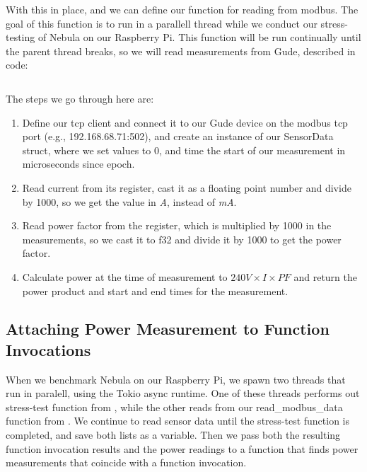 \documentclass[
  table]{report}
\providecommand{\tightlist}{%
  \setlength{\itemsep}{0pt}\setlength{\parskip}{0pt}}
\begin{document}
\inputminted[firstline = 33, lastline = 60]{rust}{assets/code/modbus.rs}

With this in place, and we can define our function for reading from
modbus. The goal of this function is to run in a parallell thread while
we conduct our stress-testing of Nebula on our Raspberry Pi. This
function will be run continually until the parent thread breaks, so we
will read measurements from Gude, described in code:

\inputminted[firstline = 0, lastline = 31]{rust}{assets/code/modbus.rs}

The steps we go through here are:

\begin{enumerate}
\def\labelenumi{\arabic{enumi}.}
\tightlist
\item
  Define our tcp client and connect it to our Gude device on the modbus
  tcp port (e.g., 192.168.68.71:502), and create an instance of our
  SensorData struct, where we set values to 0, and time the start of our
  measurement in microseconds since epoch.
\item
  Read current from its register, cast it as a floating point number and
  divide by 1000, so we get the value in \emph{A}, instead of \emph{mA}.
\item
  Read power factor from the register, which is multiplied by 1000 in
  the measurements, so we cast it to f32 and divide it by 1000 to get
  the power factor.
\item
  Calculate power at the time of measurement to \(240V \times I \times
  PF\) and return the power product and start and end times for the
  measurement.
\end{enumerate}

\subsection{Attaching Power Measurement to Function Invocations}

When we benchmark Nebula on our Raspberry Pi, we spawn two threads that
run in paralell, using the Tokio async runtime. One of these threads
performs out stress-test function from , while
the other reads from our read\_modbus\_data function from
. We continue to read sensor data until the
stress-test function is completed, and save both lists as a variable.
Then we pass both the resulting function invocation results and the
power readings to a function that finds power measurements that coincide
with a function invocation.
\end{document}
